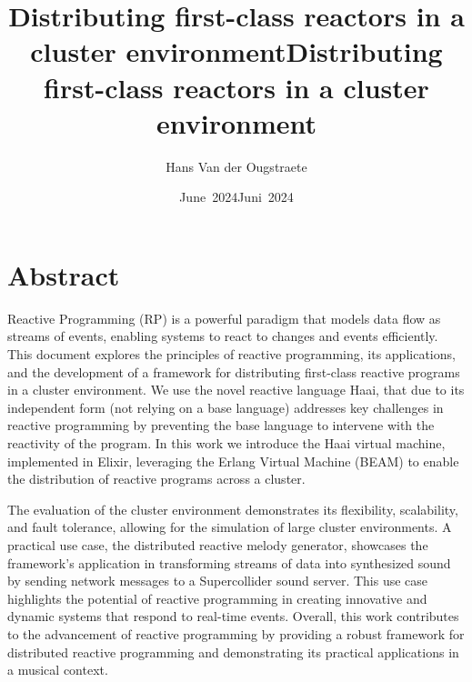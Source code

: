 \documentclass[a4paper]{book}
\title{Distributing first-class reactors in a cluster environment}
\author{Hans Van der Ougstraete}
\date{June~2024}
\begin{document}
\frontmatter
\maketitle%

\title{Distributing first-class reactors in a cluster environment}
%
\date{Juni~2024}%
%
\maketitle%

\chapter{Abstract}
Reactive Programming (RP) is a powerful paradigm that models data flow as streams of events, enabling systems to react to changes and events efficiently. This document explores the principles of reactive programming, its applications, and the development of a framework for distributing first-class reactive programs in a cluster environment. We use the novel reactive language Haai, that due to its independent form (not relying on a base language) addresses key challenges in reactive programming by preventing the base language to intervene with the reactivity of the program. In this work we introduce the Haai virtual machine, implemented in Elixir, leveraging the Erlang Virtual Machine (BEAM) to enable the distribution of reactive programs across a cluster.

The evaluation of the cluster environment demonstrates its flexibility, scalability, and fault tolerance, allowing for the simulation of large cluster environments. A practical use case, the distributed reactive melody generator, showcases the framework's application in transforming streams of data into synthesized sound by sending network messages to a Supercollider sound server. This use case highlights the potential of reactive programming in creating innovative and dynamic systems that respond to real-time events. Overall, this work contributes to the advancement of reactive programming by providing a robust framework for distributed reactive programming and demonstrating its practical applications in a musical context.
\end{document}
